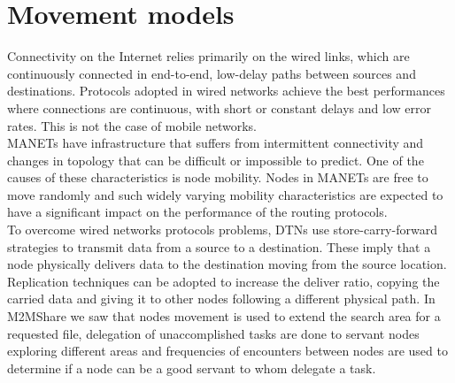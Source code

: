 
\chapter{Movement models}\label{movimento} %






Connectivity on the Internet relies primarily on the wired links, which are continuously connected in end-to-end, low-delay paths between sources and destinations. Protocols adopted in wired networks achieve the best performances where connections are continuous, with short or constant delays and low error rates. This is not the case of mobile networks.
\\

MANETs have infrastructure that suffers from intermittent connectivity and changes in topology that can be difficult or impossible to predict. One of the causes of these characteristics is node mobility. Nodes in MANETs are free to move randomly and such widely varying mobility characteristics are expected to have a significant impact on the performance of the routing protocols.
\\

To overcome wired networks protocols problems, DTNs use store-carry-forward strategies to transmit data from a source to a destination. These imply that a node physically delivers data to the destination moving from the source location. Replication techniques can be adopted to increase the deliver ratio, copying the carried data and giving it to other nodes following a different physical path. In M2MShare we saw that nodes movement is used to extend the search area for a requested file, delegation of unaccomplished tasks are done to servant nodes exploring different areas and frequencies of encounters between nodes are used to determine if a node can be a good servant to whom delegate a task.
\\

